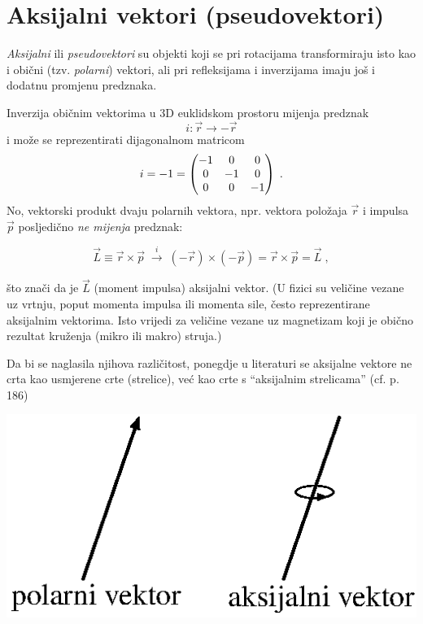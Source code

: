 \chapter{Aksijalni vektori (pseudovektori)}
\label{sec:aksijalni}

\emph{Aksijalni} ili \emph{pseudovektori} su objekti koji se pri rotacijama transformiraju
isto kao i obični (tzv. \emph{polarni}) vektori, ali pri refleksijama i inverzijama
imaju još i dodatnu promjenu predznaka.

Inverzija običnim vektorima u 3D euklidskom prostoru mijenja
predznak 
$$i: \vec{r} \to - \vec{r}$$ 
i može se reprezentirati dijagonalnom
matricom 
$$
i = -1 = 
\begin{pmatrix}
    -1 & 0 & 0 \\
    0 & -1 & 0 \\
    0 & 0 & -1
\end{pmatrix} \;.
$$
No, vektorski produkt dvaju polarnih vektora, npr. vektora položaja $\vec{r}$
i impulsa $\vec{p}$ posljedično \emph{ne mijenja} predznak:

\[  \vec{L}\equiv \vec{r}\times\vec{p} \; \stackrel{i}{\longrightarrow} \;
  (-\vec{r}) \times (-\vec{p}) =  \vec{r}\times\vec{p} = \vec{L}  \;,
\]

što znači da je $\vec{L}$ (moment impulsa) aksijalni vektor. (U fizici su
veličine vezane uz vrtnju, poput momenta impulsa ili momenta sile, 
često reprezentirane aksijalnim vektorima. Isto vrijedi za veličine
vezane uz magnetizam koji je obično rezultat kruženja (mikro ili makro) struja.)

Da bi se naglasila njihova različitost,
ponegdje u literaturi se aksijalne vektore ne crta kao usmjerene crte
(strelice), već kao crte s ``aksijalnim strelicama'' (cf. 
\cite{Bronstejn:2004} p. 186)

\centerline{\includegraphics[scale=0.8]{pics/aksijalni_vektor.eps}}

